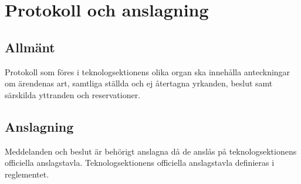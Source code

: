 \section{Protokoll och anslagning}
\subsection{Allmänt}
Protokoll som föres i teknologsektionens olika organ ska innehålla anteckningar om ärendenas art, samtliga ställda och ej återtagna yrkanden, beslut samt särskilda yttranden och reservationer.
\subsection{Anslagning}
Meddelanden och beslut är behörigt anslagna då de anslås på teknologsektionens officiella anslagstavla.
Teknologsektionens officiella anslagstavla definieras i reglementet.
